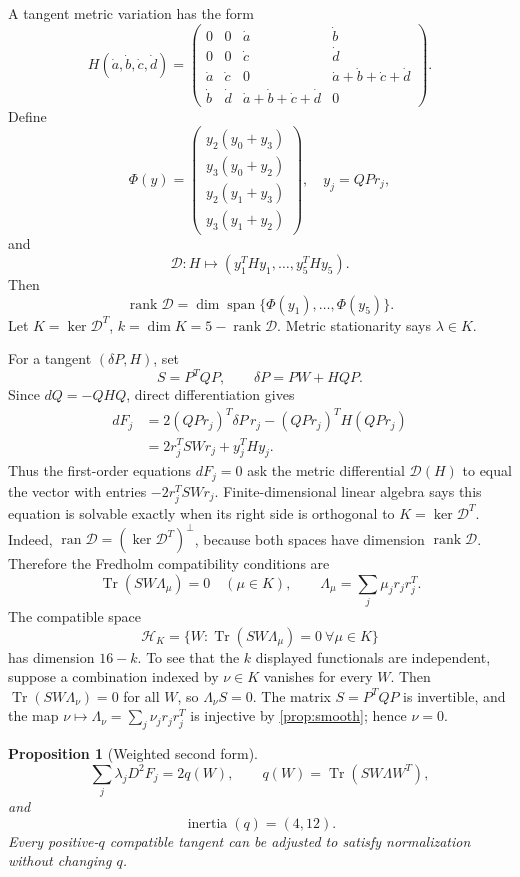 \documentclass[11pt]{article}
\newtheorem{proposition}[theorem]{Proposition}
\theoremstyle{definition}
\newcommand{\Tr}{\operatorname{Tr}}
\newcommand{\rank}{\operatorname{rank}}
\newcommand{\cD}{\mathcal D}
\begin{document}
A tangent metric variation has the form
\[
H(\dot a,\dot b,\dot c,\dot d)=
\begin{pmatrix}
0&0&\dot a&\dot b\\
0&0&\dot c&\dot d\\
\dot a&\dot c&0&\dot a+\dot b+\dot c+\dot d\\
\dot b&\dot d&\dot a+\dot b+\dot c+\dot d&0
\end{pmatrix}.
\]
Define
\[
\Phi(y)=
\begin{pmatrix}
y_2(y_0+y_3)\\
y_3(y_0+y_2)\\
y_2(y_1+y_3)\\
y_3(y_1+y_2)
\end{pmatrix},
\quad y_j=QPr_j,
\]
and
\[
\cD:H\longmapsto(y_1^THy_1,\ldots,y_5^THy_5).
\]
Then
\[
\rank\cD=\dim\operatorname{span}\{\Phi(y_1),\ldots,\Phi(y_5)\}.
\]
Let \(K=\ker\cD^T\), \(k=\dim K=5-\rank\cD\). Metric stationarity says
\(\lambda\in K\).

For a tangent \((\delta P,H)\), set
\[
S=P^TQP,\qquad \delta P=PW+HQ P.
\]
Since \(dQ=-QHQ\), direct differentiation gives
\[
\begin{aligned}
dF_j
&=2(QPr_j)^T\delta P\,r_j-(QPr_j)^TH(QPr_j)\\
&=2r_j^TSWr_j+y_j^THy_j.
\end{aligned}
\]
Thus the first-order equations \(dF_j=0\) ask the metric differential
\(\cD(H)\) to equal the vector with entries \(-2r_j^TSWr_j\).
Finite-dimensional linear algebra says this equation is solvable exactly
when its right side is orthogonal to \(K=\ker\cD^T\). Indeed,
\(\operatorname{ran}\cD=(\ker\cD^T)^\perp\), because both spaces have
dimension \(\rank\cD\). Therefore the Fredholm compatibility conditions are
\[
\Tr(SW\Lambda_\mu)=0\quad(\mu\in K),
\qquad
\Lambda_\mu=\sum_j\mu_jr_jr_j^T.
\]
The compatible space
\[
\mathcal H_K=
\{W:\Tr(SW\Lambda_\mu)=0\ \forall\mu\in K\}
\]
has dimension \(16-k\). To see that the \(k\) displayed functionals are
independent, suppose a combination indexed by \(\nu\in K\) vanishes for every
\(W\). Then \(\Tr(SW\Lambda_\nu)=0\) for all \(W\), so
\(\Lambda_\nu S=0\). The matrix \(S=P^TQP\) is invertible, and the map
\(\nu\mapsto\Lambda_\nu=\sum_j\nu_jr_jr_j^T\) is injective by
\cref{prop:smooth}; hence \(\nu=0\).

\begin{proposition}[Weighted second form]
\label{prop:second-form}
\[
\sum_j\lambda_jD^2F_j=2q(W),\qquad
q(W)=\Tr(SW\Lambda W^T),
\]
and
\[
\operatorname{inertia}(q)=(4,12).
\]
Every positive-\(q\) compatible tangent can be adjusted to satisfy
normalization without changing \(q\).
\end{proposition}
\end{document}
